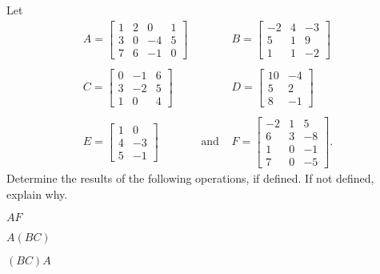 \label{sec:mtx_ops_exam}

\ExampleIntro

\begin{example} Let 
\[\begin{array}{ccc}
A = \left[ \begin{array}{ccrc} 1&2&0&1\\3&0&-4&5\\7&6&-1&0 \end{array} \right] &&  B = \left[ \begin{array}{rcr} -2&4&-3\\5&1&9\\1&1&-2 \end{array} \right] \\ 
&& \\
C = \left[ \begin{array}{crc} 0&-1&6\\3&-2&5\\1&0&4 \end{array} \right] && D = \left[ \begin{array}{cr} 10&-4\\5&2\\8&-1 \end{array} \right] \\ 
&& \\
E = \left[ \begin{array}{cr} 1&0\\4&-3\\5&-1 \end{array} \right] &\text{ and }  & F = \left[ \begin{array}{rcr} -2&1&5\\6&3&-8\\1&0&-1\\ 7&0&-5 \end{array} \right].
\end{array}\]
Determine the results of the following operations, if defined. If not defined, explain why.
	\ba
	\begin{minipage}{1.5in}
	\item $AF$
	\end{minipage}
	\begin{minipage}{1.5in}
	\item $A(BC)$
	\end{minipage}
	\begin{minipage}{1.5in}
	\item $(BC)A$
	\end{minipage}
	

\end{example}
